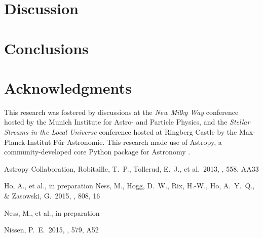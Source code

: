 \documentclass[useAMS,usenatbib]{mn2e}
\begin{document}



\section{Discussion}





\section{Conclusions}

% 


\section*{Acknowledgments}
This research was fostered by discussions at the \textit{New Milky Way}
conference hosted by the Munich Institute for Astro- and Particle Physics, and
the \textit{Stellar Streams in the Local Universe} conference hosted at Ringberg
Castle by the Max-Planck-Institut F\"ur Astronomie. This research made use of 
Astropy, a community-developed core Python package for Astronomy \citep{astropy}.

\begin{thebibliography}{99}
 Astropy Collaboration, Robitaille, T.~P., Tollerud, E.~J., et al.\ 2013, \aap, 558, AA33

 Ho, A., et al., in preparation
 Ness, M., Hogg, D.~W., Rix, H.-W., Ho, A.~Y.~Q., \& Zasowski, G.\ 2015, \apj, 808, 16 

 Ness, M., et al., in preparation

 Nissen, P.~E.\ 2015, \aap, 579, A52 


\end{thebibliography}
\end{document}
